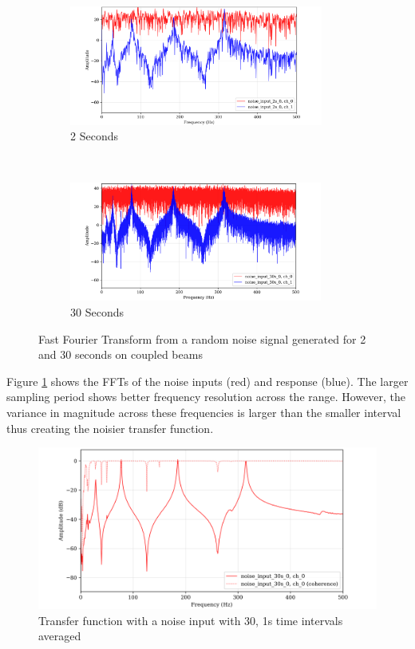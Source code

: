 \documentclass[twoside,onecolumn]{article}
\begin{document}
\begin{figure}[t!]
    \centering
    \begin{subfigure}[t]{0.5\textwidth}
        \centering
        \includegraphics[height=1.55in]{2-2snoisefft}
        \caption{2 Seconds}
    \end{subfigure}%
    ~ 
    \begin{subfigure}[t]{0.5\textwidth}
        \centering
        \includegraphics[height=1.55in]{2-30snoisefft}
        \caption{30 Seconds}
    \end{subfigure}
    \caption{Fast Fourier Transform from a random noise signal generated for 2 and 30 seconds on coupled beams}
    \label{fig:2ffts}
\end{figure}


Figure \ref{fig:2ffts} shows the FFTs of the noise inputs (red) and response (blue). The larger sampling period shows better frequency resolution across the range. However, the variance in magnitude across these frequencies is larger than the smaller interval thus creating the noisier transfer function.

\begin{figure}[!hb]
  \centering
    \includegraphics[width=\linewidth]{2-n=30}
  \caption{Transfer function with a noise input with 30, 1s time intervals averaged}
  \label{fig:n=30}
\end{figure}
\end{document}
